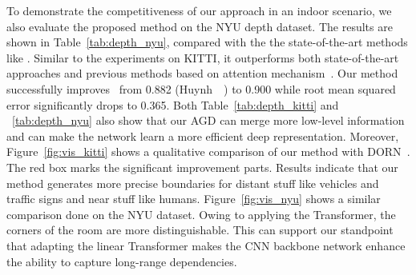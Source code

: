 \documentclass[10pt,twocolumn,letterpaper]{article}
\begin{document}
To demonstrate the competitiveness of our approach in an indoor scenario, we also evaluate the proposed method on the NYU depth dataset. The results are shown in Table~\ref{tab:depth_nyu}, compared with the the state-of-the-art methods like \cite{xu2018pad,li2017two,wang2020cliffnet,laina2016deeper,xu2017multi,lee2020multi,xia2020generating,fu2018deep,lee2019big,yin2019enforcing,huynh2020guiding}.
Similar to the experiments on KITTI, it outperforms both state-of-the-art approaches and previous methods based on attention mechanism~\cite{xu2017multi,xu2018pad,huynh2020guiding}.
Our method successfully improves~ from 0.882 (Huynh~\etal~\cite{huynh2020guiding}) to 0.900 while root mean squared error significantly drops to 0.365.
Both Table~\ref{tab:depth_kitti} and ~\ref{tab:depth_nyu} also show that our AGD can merge more low-level information and can make the network learn a more efficient deep representation.
Moreover, Figure~\ref{fig:vis_kitti} shows a qualitative comparison of our method with DORN~\cite{fu2018deep}. The red box marks the significant improvement parts. Results indicate that our method generates more precise boundaries for distant stuff like vehicles and traffic signs and near stuff like humans.
Figure~\ref{fig:vis_nyu} shows a similar comparison done on the NYU dataset. Owing to applying the Transformer, the corners of the room are more distinguishable. This can support our standpoint that adapting the linear Transformer makes the CNN backbone network enhance the ability to capture long-range dependencies. 
\end{document}
